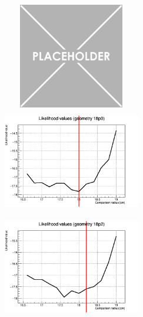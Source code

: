 \documentclass[a4paper, 11pt]{report}
\begin{document}
\begin{figure}[htbp]
\begin{minipage}[b]{.32\textwidth}
\includegraphics[width=6cm, height=4.6cm]{figs/placeholder.png}
\end{minipage}\hfill
\begin{minipage}[b]{.32\textwidth}
\includegraphics[width=6cm, height=4.6cm]{figs/likelihood250LowStat/likelihood18p0.png}
\end{minipage} \hfill
\begin{minipage}[b]{.32\textwidth}
\includegraphics[width=6cm, height=4.6cm]{figs/likelihood250LowStat/likelihood18p2.png}
\end{minipage} \hfill \vspace{10pt}


\end{figure}
\end{document}
